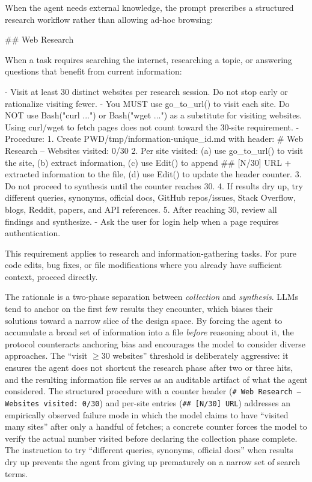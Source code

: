 \documentclass{article}
\begin{document}
When the agent needs external knowledge, the prompt prescribes a structured research workflow rather than allowing ad-hoc browsing:

\begin{prompt}
## Web Research

When a task requires searching the internet, researching
a topic, or answering questions that benefit from current
information:

- Visit at least 30 distinct websites per research
  session. Do not stop early or rationalize visiting
  fewer.
- You MUST use go_to_url() to visit each site. Do NOT
  use Bash("curl ...") or Bash("wget ...") as a
  substitute for visiting websites. Using curl/wget to
  fetch pages does not count toward the 30-site
  requirement.
- Procedure:
  1. Create PWD/tmp/information-{unique_id}.md with
     header: # Web Research -- Websites visited: 0/30
  2. Per site visited: (a) use go_to_url() to visit the
     site, (b) extract information, (c) use Edit() to
     append ## [N/30] URL + extracted information to the
     file, (d) use Edit() to update the header counter.
  3. Do not proceed to synthesis until the counter
     reaches 30.
  4. If results dry up, try different queries, synonyms,
     official docs, GitHub repos/issues, Stack Overflow,
     blogs, Reddit, papers, and API references.
  5. After reaching 30, review all findings and
     synthesize.
- Ask the user for login help when a page requires
  authentication.

This requirement applies to research and
information-gathering tasks. For pure code edits, bug
fixes, or file modifications where you already have
sufficient context, proceed directly.
\end{prompt}

\noindent The rationale is a two-phase separation between \emph{collection} and \emph{synthesis}.  LLMs tend to anchor on the first few results they encounter, which biases their solutions toward a narrow slice of the design space.  By forcing the agent to accumulate a broad set of information into a file \emph{before} reasoning about it, the protocol counteracts anchoring bias and encourages the model to consider diverse approaches.  The ``visit $\geq$30 websites'' threshold is deliberately aggressive: it ensures the agent does not shortcut the research phase after two or three hits, and the resulting information file serves as an auditable artifact of what the agent considered.  The structured procedure with a counter header (\texttt{\# Web Research --- Websites visited: 0/30}) and per-site entries (\texttt{\#\# [N/30] URL}) addresses an empirically observed failure mode in which the model claims to have ``visited many sites'' after only a handful of fetches; a concrete counter forces the model to verify the actual number visited before declaring the collection phase complete.  The instruction to try ``different queries, synonyms, official docs'' when results dry up prevents the agent from giving up prematurely on a narrow set of search terms.
\end{document}
